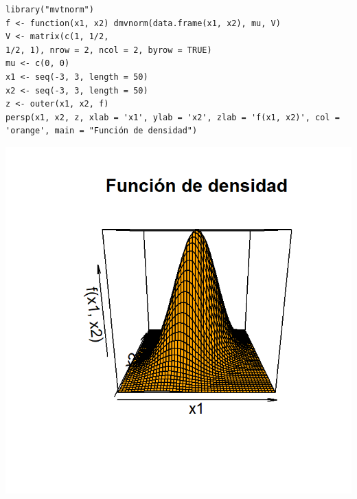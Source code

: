 \begin{lstlisting}
library("mvtnorm")
f <- function(x1, x2) dmvnorm(data.frame(x1, x2), mu, V)
V <- matrix(c(1, 1/2,
1/2, 1), nrow = 2, ncol = 2, byrow = TRUE)
mu <- c(0, 0)
x1 <- seq(-3, 3, length = 50)
x2 <- seq(-3, 3, length = 50)
z <- outer(x1, x2, f)
persp(x1, x2, z, xlab = 'x1', ylab = 'x2', zlab = 'f(x1, x2)', col = 'orange', main = "Función de densidad")
\end{lstlisting}
\begin{center}
	\includegraphics[width=0.6\linewidth]{"Temas/Imágenes/Tema 4/screenshot004"}
\end{center}

\pagebreak

